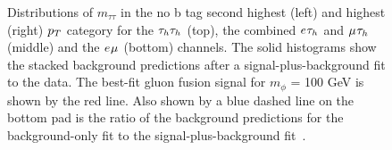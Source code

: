 \begin{figure}[!hbtp]
\caption{Distributions of $m_{\tau\tau}$ in the no b tag second highest (left) and highest (right) $p_{T}$ category for the $\tau_{h}\tau_{h}$ (top), the combined $e_{}\tau_{h}$ and $\mu_{}\tau_{h}$ (middle) and the $e_{}\mu_{}$ (bottom) channels. The solid histograms show the stacked background predictions after a signal-plus-background fit to the data. The best-fit gluon fusion signal for $m_{\phi}$ = 100 GeV is shown by the red line. Also shown by a blue dashed line on the bottom pad is the ratio of the background predictions for the background-only fit to the signal-plus-background fit~\cite{CMS:2022rbd}. }
\label{fig:low_mass_postfit}
\end{figure}

